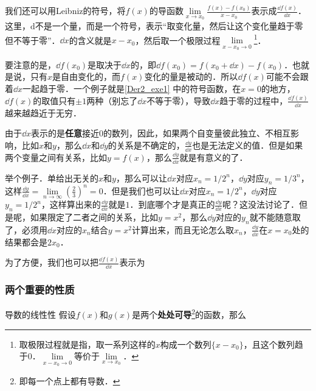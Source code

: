 我们还可以用Leibniz的符号，将$f(x)$的导函数$\lim\limits_{x\to x_0}\frac{f(x)-f(x_0)}{x-x_0}$表示成$\frac{\dd f(x)}{\dd x}$．这里，$\mathrm{d}$不是一个量，而是一个符号，表示“取变化量，然后让这个变化量趋于零但不等于零”．$\dd x$的含义就是$x-x_0$，然后取一个极限过程$\lim\limits_{x-x_0\to 0}$\footnote{取极限过程就是指，取一系列这样的$x$构成一个数列$\{x-x_0\}$，且这个数列趋于$0$．$\lim\limits_{x-x_0\to 0}$等价于$\lim\limits_{x\to x_0}$．}．

要注意的是，$\dd f(x_0)$是取决于$\dd x$的，即$\dd f(x_0)=f(x_0+\dd x)-f(x_0)$．也就是说，只有$x$是自由变化的，而$f(x)$变化的量是被动的．所以$\dd f(x)$可能不会跟着$\dd x$一起趋于零．一个例子就是\autoref{Der2_exe1} 中的符号函数，在$x=0$的地方，$\dd f(x)$的取值只有$\pm 1$两种（别忘了$\dd x$不等于零），导致$\dd x$趋于零的过程中，$\frac{\dd f(x)}{\dd x}$越来越趋近于无穷．


由于$\dd x$表示的是\textbf{任意}接近$0$的数列，因此，如果两个自变量彼此独立、不相互影响，比如$x$和$y$，那么$\dd x$和$\dd y$的关系是不确定的，$\frac{\dd y}{\dd x}$也是无法定义的值．但是如果两个变量之间有关系，比如$y=f(x)$，那么$\frac{\dd y}{\dd x}$就是有意义的了．

举个例子．单给出无关的$x$和$y$，那么可以让$\dd x$对应$x_n=1/2^n$，$\dd y$对应$y_n=1/3^n$，这样$\frac{\dd y}{\dd x}=\lim\limits_{n\to\infty}(\frac{2}{3})^n=0$．但是我们也可以让$\dd x$对应$x_n=1/2^n$，$\dd y$对应$y_n=1/2^n$，这样算出来的$\frac{\dd y}{\dd x}$就是$1$．到底哪个才是真正的$\frac{\dd y}{\dd x}$呢？这没法讨论了．但是呢，如果限定了二者之间的关系，比如$y=x^2$，那么$\dd y$对应的$y_n$就不能随意取了，必须用$\dd x$对应的$x_n$结合$y=x^2$计算出来，而且无论怎么取$x_n$，$\frac{\dd y}{\dd x}$在$x=x_0$处的结果都会是$2x_0$．

为了方便，我们也可以把$\frac{\dd f(x)}{\dd x}$表示为


\subsubsection{两个重要的性质}

\begin{theorem}{导数的线性性}
假设$f(x)$和$g(x)$是两个\textbf{处处可导}\footnote{即每一个点上都有导数．}的函数，那么
\end{theorem}





